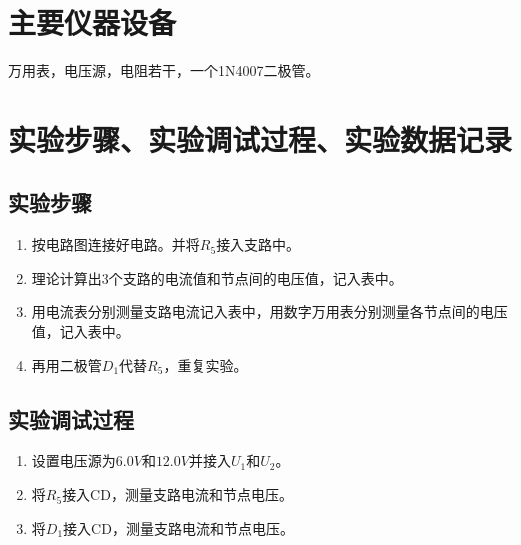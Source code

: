\documentclass{../source/Experiment}
\begin{document}
    \section{主要仪器设备}
            万用表，电压源，电阻若干，一个1N4007二极管。
    \section{实验步骤、实验调试过程、实验数据记录}
        \subsection{实验步骤}
            \begin{enumerate}
                \item 按电路图连接好电路。并将$R_5$接入支路中。
                \item 理论计算出3个支路的电流值和节点间的电压值，记入表中。
                \item 用电流表分别测量支路电流记入表中，用数字万用表分别测量各节点间的电压值，记入表中。
                \item 再用二极管$D_1$代替$R_5$，重复实验。 
            \end{enumerate}
        \subsection{实验调试过程}
            \begin{enumerate}
                \item 设置电压源为$6.0V$和$12.0V$并接入$U_1$和$U_2$。
                \item 将$R_5$接入CD，测量支路电流和节点电压。
                \item 将$D_1$接入CD，测量支路电流和节点电压。
            \end{enumerate}
\end{document}
